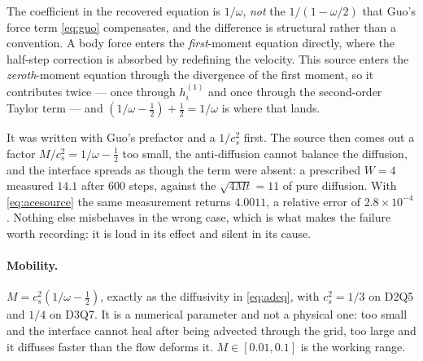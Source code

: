 \documentclass[11pt,a4paper]{article}
\newcommand{\cs}{c_s}
\newcommand{\e}[1]{\times 10^{#1}}
\begin{document}
The coefficient in the recovered equation is $1/\omega$, \emph{not} the
$1/(1-\omega/2)$ that Guo's force term \eqref{eq:guo} compensates, and the
difference is structural rather than a convention. A body force enters the
\emph{first}-moment equation directly, where the half-step correction is
absorbed by redefining the velocity. This source enters the \emph{zeroth}-moment
equation through the divergence of the first moment, so it contributes twice ---
once through $h_i^{(1)}$ and once through the second-order Taylor term --- and
$(1/\omega - \tfrac12) + \tfrac12 = 1/\omega$ is where that lands.

It was written with Guo's prefactor and a $1/\cs^2$ first. The source then comes
out a factor $M/\cs^2 = 1/\omega - \tfrac12$ too small, the anti-diffusion cannot
balance the diffusion, and the interface spreads as though the term were absent:
a prescribed $W=4$ measured $14.1$ after 600 steps, against the $\sqrt{4Mt}=11$
of pure diffusion. With \eqref{eq:acesource} the same measurement returns
$4.0011$, a relative error of $2.8\e{-4}$. Nothing else misbehaves in the wrong
case, which is what makes the failure worth recording: it is loud in its effect
and silent in its cause.

\paragraph{Mobility.} $M = \cs^2(1/\omega - \tfrac12)$, exactly as the
diffusivity in \eqref{eq:adeq}, with $\cs^2 = 1/3$ on D2Q5 and $1/4$ on D3Q7. It
is a numerical parameter and not a physical one: too small and the interface
cannot heal after being advected through the grid, too large and it diffuses
faster than the flow deforms it. $M\in[0.01,0.1]$ is the working range.
\end{document}
